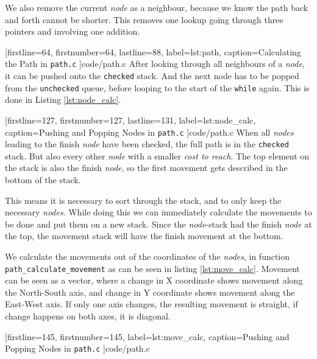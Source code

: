 We also remove the current \emph{node} as a neighbour,
because we know the path back and forth cannot be shorter.
This removes one lookup going through three pointers and involving one addition.


[firstline=64,			%
firstnumber=64,
lastline=88,			%
label=lst:path,	%
caption={Calculating the Path in {\tt path.c}}
]{code/path.c}
%
After looking through all neighbours of a \emph{node},
it can be pushed onto the {\tt checked} stack.
And the next node has to be popped from the {\tt unchecked} queue,
before looping to the start of the {\tt while} again.
This is done in Listing \ref{lst:node_calc}.


[firstline=127,			%
firstnumber=127,
lastline=131,			%
label=lst:node_calc,	%
caption={Pushing and Popping Nodes in {\tt path.c}}
]{code/path.c}
%
When all \emph{nodes} leading to the finish \emph{node} have been checked,
the full path is in the {\tt checked} stack.
But also every other \emph{node} with a smaller \emph{cost to reach}.
The top element on the stack is also the finish \emph{node},
so the first movement gets described in the bottom of the stack.

This means it is necessary to sort through the stack,
and to only keep the necessary \emph{nodes}.
While doing this we can immediately calculate the movements to be done
and put them on a new stack.
Since the \emph{node}-stack had the finish \emph{node} at the top,
the movement stack will have the finish movement at the bottom.

We calculate the movements out of the coordinates of the \emph{nodes},
in function {\tt path\_calculate\_movement} as can be seen in listing \ref{lst:move_calc}.
Movement can be seen as a vector,
where a change in X coordinate shows movement along the North-South axis,
and change in Y coordinate shows movement along the East-West axis.
If only one axis changes, the resulting movement is straight,
if change happens on both axes, it is diagonal.


[firstline=145,			%
firstnumber=145,
label=lst:move_calc,	%
caption={Pushing and Popping Nodes in {\tt path.c}}
]{code/path.c}
%